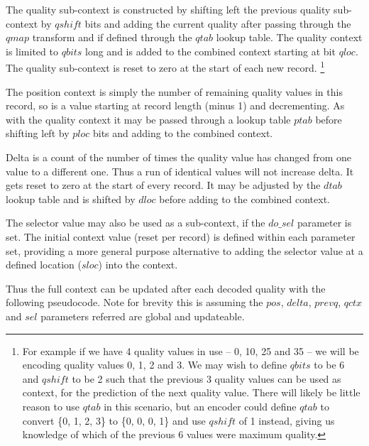 \documentclass[a4paper]{article}
\begin{document}
The quality sub-context is constructed by shifting left the previous
quality sub-context by $qshift$ bits and adding the current quality
after passing through the $qmap$ transform and if defined
through the $qtab$ lookup table.  The quality context is limited to
$qbits$ long and is added to the combined context starting at bit
$qloc$.  The quality sub-context is reset to zero at the start of each
new record.
\footnote{For example if we have 4 quality values in use -- 0, 10, 25 and
35 -- we will be encoding quality values 0, 1, 2 and 3.  We may wish to
define $qbits$ to be 6 and $qshift$ to be 2 such that the previous 3
quality values can be used as context, for the prediction of the next
quality value.  There will likely be little reason to use $qtab$ in
this scenario, but an encoder could define $qtab$ to convert \{0, 1, 2, 3\}
to \{0, 0, 0, 1\} and use $qshift$ of 1 instead, giving us
knowledge of which of the previous 6 values were maximum quality.}

The position context is simply the number of remaining quality values
in this record, so is a value starting at record length (minus 1) and
decrementing.  As with the quality context it may be passed through a
lookup table $ptab$ before shifting left by $ploc$ bits and adding to
the combined context.

Delta is a count of the number of times the quality value has changed
from one value to a different one.  Thus a run of identical values
will not increase delta.  It gets reset to zero at the start of every
record.  It may be adjusted by the $dtab$ lookup table and is shifted
by $dloc$ before adding to the combined context.

The selector value may also be used as a sub-context, if the $do\_sel$
parameter is set.  The initial context value (reset per record) is
defined within each parameter set, providing a more general purpose
alternative to adding the selector value at a defined location
($sloc$) into the context.

Thus the full context can be updated after each decoded quality with
the following pseudocode.  Note for brevity this is assuming the
$pos$, $delta$, $prevq$, $qctx$ and $sel$ parameters referred are global and updateable.
\end{document}

